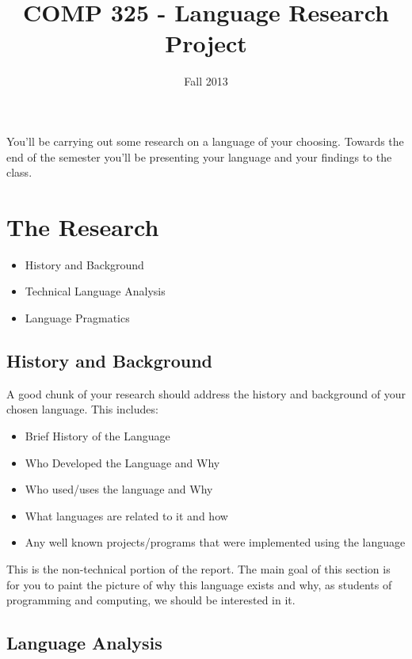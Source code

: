 \documentclass[10pt]{article}
\title{COMP 325 - Language Research Project}
\author{  }
\date{Fall 2013}
\begin{document}
\maketitle

You'll be carrying out some research on a language of your choosing.  Towards the end of the semester you'll be presenting your language and your findings to the class.

\section{The Research}

\begin{itemize}
\item History and Background
\item Technical Language Analysis
\item Language Pragmatics
\end{itemize}


\subsection{History and Background}

A good chunk of your research should address the history and background of your chosen language.  This includes:
\begin{itemize}
\item Brief History of the Language
\item Who Developed the Language and Why
\item Who used/uses the language and Why
\item What languages are related to it and how
\item Any well known projects/programs that were implemented using the language
\end{itemize}
This is the non-technical portion of the report.  The main goal of this section is for you to paint the picture of why this language exists and why, as students of programming and computing, we should be interested in it.  

\subsection{Language Analysis}
\end{document}
